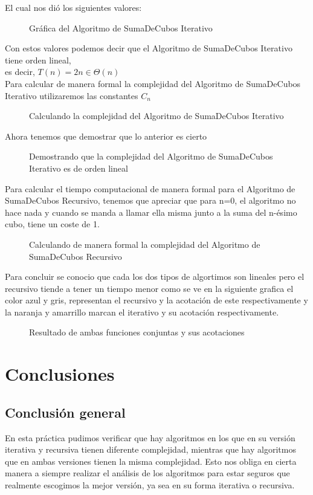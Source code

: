 \documentclass[12pt,twoside]{article}
\newcommand{\addfigure}[4]{
        \begin{figure}[htbp!]
            \begin{center}	
                \fbox{\texttt{[image: \#2]}}
                \caption{#4}
                \label{#3}
            \end{center}
        \end{figure}
  }
\begin{document}
    El cual nos dió los siguientes valores:
    \\ 
    \addfigure{.8}{img_dos/SumanIterativo}{fig:grafIterativo}{Gráfica del Algoritmo de SumaDeCubos Iterativo}
        
    Con estos valores podemos decir que el Algoritmo de SumaDeCubos Iterativo tiene orden lineal,\\ es decir, $T(n) = 2n \in \Theta(n)$\\
    Para calcular de manera formal la complejidad del Algoritmo de SumaDeCubos Iterativo utilizaremos las constantes $C_n$
    
    \addfigure{.8}{img_dos/Complejidad_SI}{fig:W}{Calculando la complejidad del Algoritmo de SumaDeCubos Iterativo}
    Ahora tenemos que demostrar que lo anterior es cierto
    
    \addfigure{.7}{img_dos/Demostracion_SI}{fig:W}{Demostrando que la complejidad del Algoritmo de SumaDeCubos Iterativo es de orden lineal}
    
    Para calcular el tiempo computacional de manera formal para el Algoritmo de SumaDeCubos Recursivo, tenemos que apreciar que para n=0, el algoritmo no hace nada y cuando se manda a llamar ella misma junto a la suma del n-ésimo cubo, tiene un coste de 1.
    \\
    \addfigure{.7}{img_dos/Demostracion_SR}{fig:W}{Calculando de manera formal la complejidad del Algoritmo de SumaDeCubos Recursivo}
    
    Para concluir se conocio que cada los dos tipos de algortimos son lineales pero el recursivo tiende a tener un tiempo menor como se ve en la siguiente grafica el color azul y gris, representan el recursivo y la acotación de este respectivamente y la naranja y amarrillo marcan el iterativo y su acotación respectivamente.
    
     \addfigure{.7}{img_dos/Suman}{fig:sumanall}{Resultado de ambas funciones conjuntas y sus acotaciones}
    
\section{Conclusiones}
\vspace{10 mm}
\subsection*{Conclusión general}
En esta pr\'{a}ctica pudimos verificar que hay algoritmos en los que en su versi\'{o}n iterativa y recursiva tienen diferente complejidad, mientras que hay algoritmos que en ambas versiones tienen la misma complejidad. Esto nos obliga en cierta manera a siempre realizar el an\'{a}lisis de los algoritmos para estar seguros que realmente escogimos la mejor versi\'{o}n, ya sea en su forma iterativa o recursiva.
\end{document}
